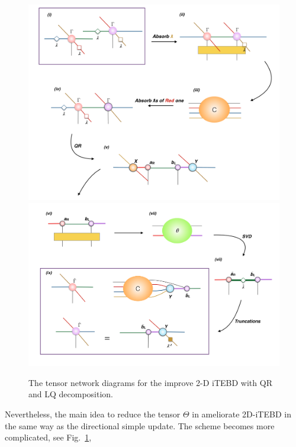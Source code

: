 \begin{figure}[!ht]
	\centering
	\includegraphics[width=1.00\textwidth]{figures/fig319.png}
	\includegraphics[width=1.00\textwidth]{figures/fig320.png}
	\caption[The tensor network diagrams for the improve 2-D iTEBD with QR and LQ decomposition]{The tensor network diagrams for the improve 2-D iTEBD with QR and LQ decomposition.}
	\label{fig320}
\end{figure}

Nevertheless, the main idea to reduce the tensor $\Theta$ in ameliorate 2D-iTEBD in the same way as the directional simple update. The scheme becomes more complicated, see Fig.~\ref{fig320}, 

